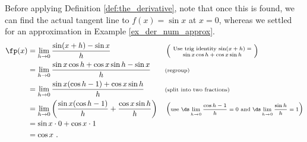 {Before applying Definition \ref{def:the_derivative}, note that once this is found, we can find the actual tangent line to $f(x) = \sin x$ at $x=0$, whereas we settled for an approximation in Example \ref{ex_der_num_approx}. 
	\small
	\begin{align*}
		\fp(x)
		&= \lim_{h\to 0} \frac{\sin(x+h)-\sin x}{h} & & \left(\text{\scriptsize \parbox{110pt}{\centering Use trig identity $\sin(x+h) = \sin x\cos h+\cos x\sin h$}}\right) \\
		&= \lim_{h\to 0} \frac{\sin x\cos h+\cos x\sin h-\sin x}{h} & & \text{\scriptsize (regroup)}\\
		&= \lim_{h\to 0} \frac{\sin x(\cos h-1) + \cos x\sin h}{h} & & \text{\scriptsize (split into two fractions)}\\
		&= \lim_{h\to 0} \left(\frac{\sin x(\cos h-1)}{h} + \frac{\cos x\sin h}{h}\right) & & \left(\text{\scriptsize use $\ds \lim_{h\to 0} \frac{\cos h-1}{h} = 0$ and $\ds \lim_{h\to 0} \frac{\sin h}{h} = 1$}\right)\\
		&=	\sin x\cdot 0 + \cos x \cdot 1 \\
		&= \cos x\ .
	\end{align*}}

